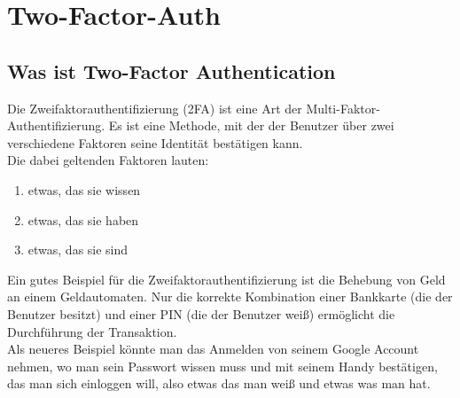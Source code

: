 \section{Two-Factor-Auth}
\label{sec:2fa}
\subsection{Was ist Two-Factor Authentication}
Die Zweifaktorauthentifizierung (2FA) ist eine Art der Multi-Faktor-Authentifizierung. Es ist eine Methode, mit der der Benutzer über zwei verschiedene Faktoren seine Identität bestätigen kann.\\
Die dabei geltenden Faktoren lauten:
\begin{enumerate}
\item etwas, das sie wissen
\item etwas, das sie haben
\item etwas, das sie sind
\end{enumerate}
Ein gutes Beispiel für die Zweifaktorauthentifizierung ist die Behebung von Geld an einem Geldautomaten. Nur die korrekte Kombination einer Bankkarte (die der Benutzer besitzt) und einer PIN (die der Benutzer weiß) ermöglicht die Durchführung der Transaktion.\\Als neueres Beispiel könnte man das Anmelden von seinem Google Account nehmen, wo man sein Passwort wissen muss und mit seinem Handy bestätigen, das man sich einloggen will, also etwas das man weiß und etwas was man hat. 
\textcite{2FA}
